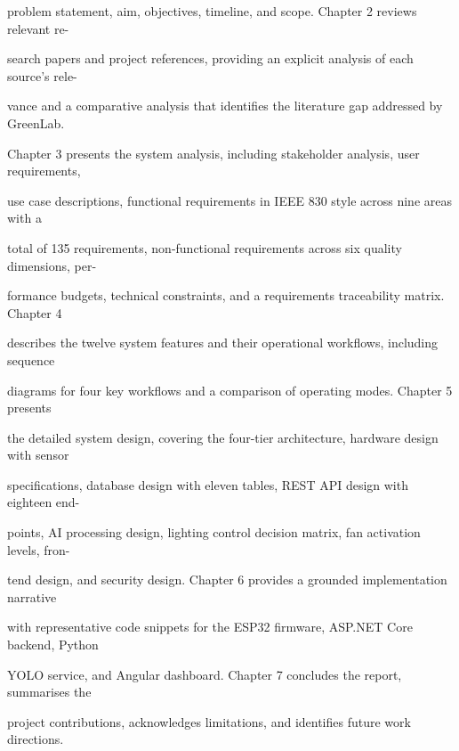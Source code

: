 problem statement, aim, objectives, timeline, and scope. Chapter 2 reviews relevant re-

search papers and project references, providing an explicit analysis of each source's rele-

vance and a comparative analysis that identiﬁes the literature gap addressed by GreenLab.

Chapter 3 presents the system analysis, including stakeholder analysis, user requirements,

use case descriptions, functional requirements in IEEE 830 style across nine areas with a

total of 135 requirements, non-functional requirements across six quality dimensions, per-

formance budgets, technical constraints, and a requirements traceability matrix. Chapter 4

describes the twelve system features and their operational workﬂows, including sequence

diagrams for four key workﬂows and a comparison of operating modes. Chapter 5 presents

the detailed system design, covering the four-tier architecture, hardware design with sensor

speciﬁcations, database design with eleven tables, REST API design with eighteen end-

points, AI processing design, lighting control decision matrix, fan activation levels, fron-

tend design, and security design. Chapter 6 provides a grounded implementation narrative

with representative code snippets for the ESP32 ﬁrmware, ASP.NET Core backend, Python

YOLO service, and Angular dashboard. Chapter 7 concludes the report, summarises the

project contributions, acknowledges limitations, and identiﬁes future work directions.


